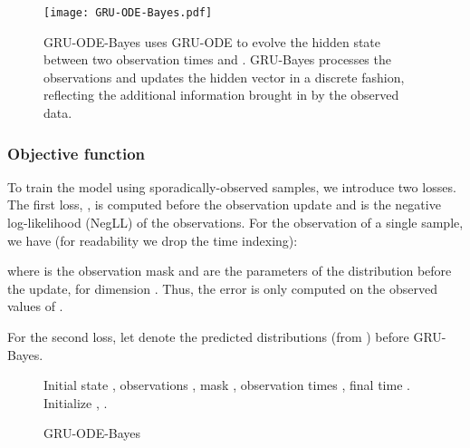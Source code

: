 \documentclass{article}
\begin{document}
\begin{figure}[H]
\vskip 0.0in 
\begin{center}
\centerline{\texttt{[image: GRU-ODE-Bayes.pdf]}}
\caption{GRU-ODE-Bayes uses GRU-ODE to evolve the hidden state between two observation times  and . GRU-Bayes processes the observations and updates the hidden vector  in a discrete fashion, reflecting the additional information brought in by the observed data.}
\label{fig:gru-ode-bayes}
\end{center}
\vskip -0.2in
\end{figure}





\subsubsection*{Objective function}
To train the model using sporadically-observed samples, we introduce two losses. The first loss, , is computed before the observation update and is the negative log-likelihood (NegLL) of the observations. For the observation of a single sample, we have (for readability we drop the time indexing):

where  is the observation mask and  are the parameters of the distribution before the update, for dimension . Thus, the error is only computed on the observed values of .





For the second loss, let  denote the predicted distributions (from ) before GRU-Bayes.

\begin{wrapfigure}[18]{r}{0.5\textwidth}
\begin{minipage}{0.5\textwidth}
\begin{algorithm}[H]
   \caption{GRU-ODE-Bayes}
   \label{alg:gru-ode-bayes}
\begin{algorithmic}
    Initial state ,
   \STATE \quad\quad observations , mask ,
   \STATE \quad \quad observation times , final time .
   \STATE Initialize , .
        \STATE {}
       \STATE   
       \STATE 
       \STATE {}
       \STATE  
\STATE {}
       \STATE   
\STATE {}
       \STATE  
   \ENDFOR
    \STATE {}
   \STATE   
\end{algorithmic}
\end{algorithm}
\end{minipage}
\end{wrapfigure}
\end{document}
